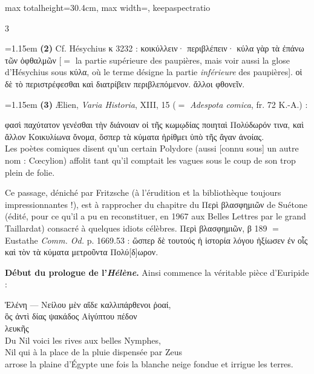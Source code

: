 \documentclass[11pt,twoside]{book}
\newcommand{\italique}[1]{\textit{#1}}
\newcommand{\citComm}[1]{\begin{quoting}[vskip=0.4pt,leftmargin=0.7em,rightmargin=0.2em]#1\end{quoting}}
\newcommand{\francais}[1]{{\policeFr #1}}
\newcommand{\latin}[1]{\textit{#1}}
\newcommand{\difference}[1]{\dotuline{#1}}
\begin{document}
\begin{adjustbox}{max totalheight=30.4cm, max width=\textwidth, keepaspectratio}
\begin{minipage}{\textwidth}
{\begin{multicols}{3}
\par\vspace{1.5pt}
\noindent\hangindent=1.15em {\color{sepiaNote}\textbf{(2)}} Cf. Hésychius κ 3232 : κοικύλλειν· περιβλέπειν· κύλα γὰρ τὰ ἐπάνω τῶν ὀφθαλμῶν [$=$ la partie supérieure des paupières, mais voir aussi la glose d'Hésychius sous κύλα, où le terme désigne la partie \italique{inférieure} des paupières]. οἱ δὲ τὸ περιστρέφεσθαι καὶ διατρίβειν περιβλεπόμενον. ἄλλοι φθονεῖν.
\par\vspace{1.5pt}
\noindent\hangindent=1.15em {\color{sepiaNote}\textbf{(3)}} Ælien, \italique{Varia Historia}, XIII, 15 ($=$ \latin{Adespota comica}, fr. 72 K.-A.) :
\citComm{φασὶ παχύτατον γενέσθαι τὴν διάνοιαν οἱ τῆς κωμῳδίας ποιηταὶ Πολύδωρόν τινα, καὶ ἄλλον Κοικυλίωνα ὄνομα, ὅσπερ τὰ κύματα ἠρίθμει ὑπὸ τῆς ἄγαν ἀνοίας.\\
\francais{Les poètes comiques disent qu'un certain Polydore (aussi [connu sous] un autre nom : Cœcylion) affolit tant qu'il comptait les vagues sous le coup de son trop plein de folie.}}
\par\vspace{1.5pt}
\noindent Ce passage, déniché par Fritzsche (à l'érudition et la bibliothèque toujours impressionnantes !), est à rapprocher du chapitre du Περὶ βλασφημιῶν de Suétone (édité, pour ce qu'il a pu en reconstituer, en 1967 aux Belles Lettres par le grand Taillardat) consacré à quelques idiots célèbres. Περὶ βλασφημιῶν, β 189 $=$ Eustathe \italique{Comm. Od.} p. 1669.53 : ὥσπερ δὲ τουτούς ἡ ἱστορία λόγου ἠξίωσεν ἐν οἷς καὶ τὸν τὰ κύματα μετροῦντα Πολύ[δ]ωρον.
\par\vspace{1.5pt}
 \textbf{Début du prologue de l'\italique{Hélène}.} Ainsi commence la véritable pièce d'Euripide :
\citComm{Ἑλένη --- Νείλου μὲν αἵδε καλλιπάρθενοι ῥοαί,\\
ὃς ἀντὶ δίας ψακάδος Αἰγύπτου πέδον\\
λευκῆς \difference{τακείσης χιόνος ὑγραίνει γύας.}\\
\francais{Du Nil voici les rives aux belles Nymphes,\\
Nil qui à la place de la pluie dispensée par Zeus\\
arrose la plaine d'Égypte une fois la blanche neige fondue et irrigue les terres.}}
\par\vspace{1.5pt}

\end{multicols}}
\end{minipage}
\end{adjustbox}
\end{document}

